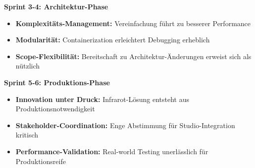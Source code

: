 \textbf{Sprint 3-4: Architektur-Phase}
\begin{itemize}
    \item \textbf{Komplexitäts-Management:} Vereinfachung führt zu besserer Performance
    \item \textbf{Modularität:} Containerization erleichtert Debugging erheblich
    \item \textbf{Scope-Flexibilität:} Bereitschaft zu Architektur-Änderungen erweist sich als nützlich
\end{itemize}

\textbf{Sprint 5-6: Produktions-Phase}
\begin{itemize}
    \item \textbf{Innovation unter Druck:} Infrarot-Lösung entsteht aus Produktionsnotwendigkeit
    \item \textbf{Stakeholder-Coordination:} Enge Abstimmung für Studio-Integration kritisch
    \item \textbf{Performance-Validation:} Real-world Testing unerlässlich für Produktionsreife
\end{itemize}